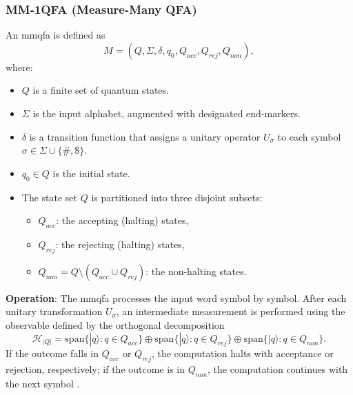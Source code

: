 \subsubsection{MM-1QFA (Measure-Many QFA)}
\label{sssec:mm-1qfa}
\begin{definition}[MM-1QFA]
An \gls{mmqfa} is defined as 
\[
M = (Q, \Sigma, \delta, q_0, Q_{acc}, Q_{rej}, Q_{non}),
\]
where:
\begin{itemize}
    \item \( Q \) is a finite set of quantum states.
    \item \( \Sigma \) is the input alphabet, augmented with designated end-markers.
    \item \( \delta \) is a transition function that assigns a unitary operator \( U_\sigma \) to each symbol \( \sigma \in \Sigma \cup \{\#, \$\} \).
    \item \( q_0 \in Q \) is the initial state.
    \item The state set \( Q \) is partitioned into three disjoint subsets:
    \begin{itemize}
        \item \( Q_{acc} \): the accepting (halting) states,
        \item \( Q_{rej} \): the rejecting (halting) states,
        \item \( Q_{non} = Q \setminus (Q_{acc} \cup Q_{rej}) \): the non-halting states.
    \end{itemize}
\end{itemize}
\end{definition}

\textbf{Operation}:  
The \gls{mmqfa} processes the input word symbol by symbol. After each unitary transformation \( U_\sigma \), an intermediate measurement is performed using the observable defined by the orthogonal decomposition 
\[
\mathcal{H}_{|Q|} = \mathrm{span}\{ |q\rangle : q \in Q_{acc} \} \oplus \mathrm{span}\{ |q\rangle : q \in Q_{rej} \} \oplus \mathrm{span}\{ |q\rangle : q \in Q_{non} \}.
\]
If the outcome falls in \( Q_{acc} \) or \( Q_{rej} \), the computation halts with acceptance or rejection, respectively; if the outcome is in \( Q_{non} \), the computation continues with the next symbol \cite{kondacs1997power,ambainis2009superiority}.

